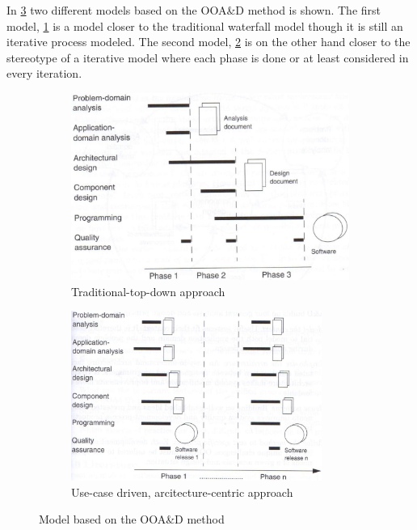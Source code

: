 
In \cref{fig:SUModels} two different models based on the OOA\&D method is shown.
The first model, \cref{fig:SUModel1} is a model closer to the traditional waterfall model though it is still an iterative process modeled.
The second model, \cref{fig:SUModel2} is on the other hand closer to the stereotype of a iterative model where each phase is done or at least considered in every iteration.

\begin{figure}[H]
	\centering
	\begin{subfigure}[b]{0.48\textwidth}
		\includegraphics[width=\textwidth]{billeder/SUModel1.jpg}
		\caption{Traditional-top-down approach \citep[p.~16]{Rod-Aalborg}}
		\label{fig:SUModel1}
	\end{subfigure}
	\quad
	\begin{subfigure}[b]{0.48\textwidth}
		\includegraphics[width=0.9\textwidth]{billeder/SUModel2.jpg}
		\caption{Use-case driven, arcitecture-centric approach \citep[p.~17]{Rod-Aalborg}}
		\label{fig:SUModel2}
	\end{subfigure}
	\caption{Model based on the OOA\&D method}\label{fig:SUModels}
\end{figure}

